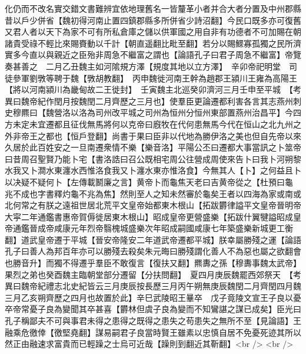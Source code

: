 化仍而不改名實交錯文書難辨宜依地理舊名一皆釐革小者并合大者分置及中州郡縣昔以戶少併省【魏初得河南止置四鎮郡縣多所併省少詩沼翻】今民口既多亦可復舊又君人者以天下為家不可有所私倉庫之儲以供軍國之用自非有功德者不可加賜在朝諸貴受祿不輕比來賜賚動以千計【朝直遥翻比毗至翻】若分以賜鰥寡孤獨之民所濟實多今直以與親近之臣殆非周急不繼富之謂也【論語孔子曰君子周急不繼富】帝覽奏甚善之　二月乙丑魏主如河隂規方澤【規度其地以立方澤】　辛卯帝祀明堂　司徒參軍劉斆等聘于魏【斆胡教翻】　丙申魏徙河南王幹為趙郡王潁川王雍為高陽王【將以河南潁川為畿甸故二王徙封】　壬寅魏主北巡癸卯濟河三月壬申至平城　【考異曰魏帝紀作閏月按魏閏二月齊歷之三月也】使羣臣更論遷都利害各言其志燕州刺史穆羆曰【魏營洛以洛為司州改平城之司州為恒州分恒州東部置燕州治昌平】今四方未定未宜遷都且征伐無馬將何以克帝曰廐牧在代何患無馬今代在恒山之北九州之外非帝王之都也【恒戶登翻】尚書于果曰臣非以代地為勝伊洛之美也但自先帝以來久居於此百姓安之一旦南遷衆情不樂【樂音洛】平陽公丕曰遷都大事當訊之卜筮帝曰昔周召聖賢乃能卜宅【書洛誥曰召公既相宅周公往營成周使來告卜曰我卜河朔黎水我又卜澗水東瀍水西惟洛食我又卜瀍水東亦惟洛食】今無其人【卜】之何益且卜以决疑不疑何卜【左傳載鬭廉之言】黄帝卜而龜焦天老曰吉黄帝從之【杜預曰龜兆不成也字書釋灼龜不兆為焦】然則至人之知未然審於龜矣王者以四海為家或南或北何常之有朕之遠祖世居北荒平文皇帝始都東木根山【拓跋欝律謚平文皇帝晉明帝大寜二年通鑑書惠帝賀傉徙居東木根山】昭成皇帝更營盛樂【拓跋什翼犍謚昭成皇帝通鑑晉成帝咸康元年烈帝翳槐城盛樂次年昭成嗣國咸康七年築盛樂新城更工衡翻】道武皇帝遷于平城【晉安帝隆安二年道武帝遷都平城】朕幸屬勝殘之運【論語孔子曰善人為邦百年亦可以勝殘去殺矣朱元晦曰勝殘謂化善人不為惡也屬之欲翻會也勝音升】而獨不得遷乎羣臣不敢復言【復扶又翻】羆夀之孫【穆夀事魏太武帝】果烈之弟也癸酉魏主臨朝堂部分遷留【分扶問翻】　夏四月庚辰魏罷西郊祭天　【考異曰魏帝紀禮志北史紀皆云三月庚辰按長歷三月丙午朔無庚辰魏閏二月齊閏四月魏三月乙亥朔齊歷之四月也故置於此】辛巳武陵昭王曅卒　戊子竟陵文宣王子良以憂卒帝常憂子良為變聞其卒甚喜【欝林但虞子良為變而不知鸞諶之謀已成矣】臣光曰孔子稱鄙夫不可與事君未得之患得之既得之患失之苟患失之無所不至【見論語】王融乘危徼倖【徼堅堯翻】謀易嗣君子良當時賢王雖素以忠慎自居不免憂死迹其所以然正由融速求富貴而已輕躁之士烏可近哉【躁則到翻近其靳翻】<br />
<br />
